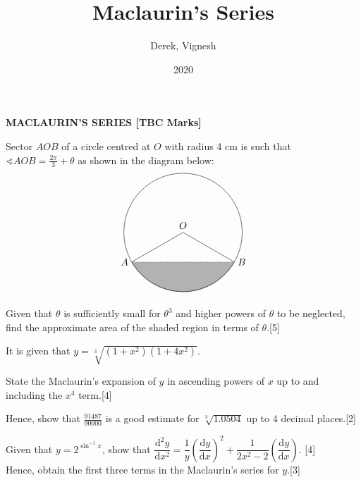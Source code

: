 \documentclass[12pt, a4 paper]{article}
\title{Maclaurin's Series}
\author{Derek, Vignesh}
\date{2020}
\begin{document}
\maketitle

\textbf{MACLAURIN'S SERIES [TBC Marks]}
\begin{outline}[enumerate]
\1 Sector $AOB$ of a circle centred at $O$ with radius 4 cm is such that $\sphericalangle AOB = \frac{2\pi}{3}+\theta$ as shown in the diagram below: %
\[
\begin{tikzpicture}
  \draw (0,0) node[above]{$O$} circle (60pt);
  \draw (-51.96152pt,-30pt) node[left]{$A$} -- (0,0);
  \draw (51.96152pt,-30pt) node[right]{$B$} -- (0,0);
  \filldraw[color=white!70!black,draw=black] (-51.96152pt,-30pt) arc (210:330:60pt);
  \draw[dotted](-51.96152pt,-30pt) -- (51.96152pt,-30pt);
\end{tikzpicture}
\]
Given that $\theta$ is sufficiently small for $\theta^3$ and higher powers of $\theta$ to be neglected, find the approximate area of the shaded region in terms of $\theta$.\hfill[5]

\1 It is given that $y=\sqrt[3]{(1+x^2)(1+4x^2)}$. %

  \2 State the Maclaurin's expansion of $y$ in ascending powers of $x$ up to and including the $x^4$ term.\hfill[4]

  \2 Hence, show that $\frac{91487}{90000}$ is a good estimate for $\sqrt[3]{1.0504}$  up to 4 decimal places.\hfill[2]

\1 Given that $y=2^{\sin^{-1}{x}}$, show that $\dfrac{\mathrm{d}^2y}{\mathrm{d}x^2}=\dfrac{1}{y}\left(\dfrac{\mathrm{d}y}{\mathrm{d}x}\right)^2+\dfrac{1}{2x^2-2}\left(\dfrac{\mathrm{d}y}{\mathrm{d}x}\right)$. \hfill[4] \\
Hence, obtain the first three terms in the Maclaurin's series for $y$.\hfill[3] %

\1


\end{outline}
\end{document}

